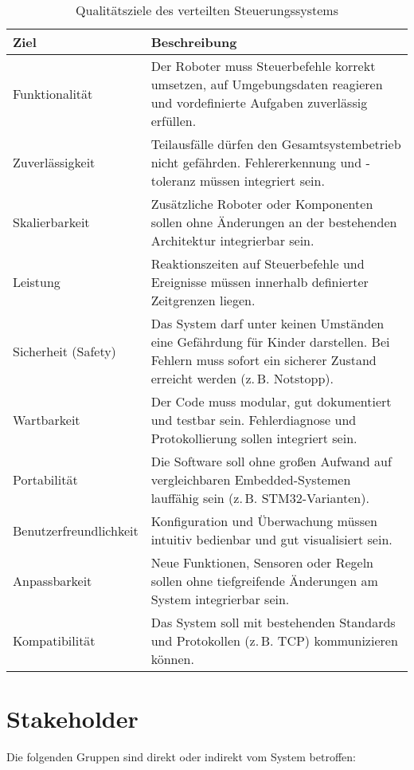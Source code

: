 \begin{table}[h]
    \centering
    \begin{tabular}{p{4cm}|p{10cm}}
        \hline
        \textbf{Ziel} & \textbf{Beschreibung} \\
        \hline
        Funktionalität & Der Roboter muss Steuerbefehle korrekt umsetzen, auf Umgebungsdaten reagieren und vordefinierte Aufgaben zuverlässig erfüllen. \\
        Zuverlässigkeit & Teilausfälle dürfen den Gesamtsystembetrieb nicht gefährden. Fehlererkennung und -toleranz müssen integriert sein. \\
        Skalierbarkeit & Zusätzliche Roboter oder Komponenten sollen ohne Änderungen an der bestehenden Architektur integrierbar sein. \\
        Leistung & Reaktionszeiten auf Steuerbefehle und Ereignisse müssen innerhalb definierter Zeitgrenzen liegen. \\
        Sicherheit (Safety) & Das System darf unter keinen Umständen eine Gefährdung für Kinder darstellen. Bei Fehlern muss sofort ein sicherer Zustand erreicht werden (z. B. Notstopp). \\
        Wartbarkeit & Der Code muss modular, gut dokumentiert und testbar sein. Fehlerdiagnose und Protokollierung sollen integriert sein. \\
        Portabilität & Die Software soll ohne großen Aufwand auf vergleichbaren Embedded-Systemen lauffähig sein (z. B. STM32-Varianten). \\
        Benutzerfreundlichkeit & Konfiguration und Überwachung müssen intuitiv bedienbar und gut visualisiert sein. \\
        Anpassbarkeit & Neue Funktionen, Sensoren oder Regeln sollen ohne tiefgreifende Änderungen am System integrierbar sein. \\
        Kompatibilität & Das System soll mit bestehenden Standards und Protokollen (z. B. TCP) kommunizieren können. \\
        \hline
    \end{tabular}
    \caption{Qualitätsziele des verteilten Steuerungssystems}
    \label{tab:qualitaetsziele}
\end{table}

\newpage
\section{Stakeholder}

Die folgenden Gruppen sind direkt oder indirekt vom System betroffen:


